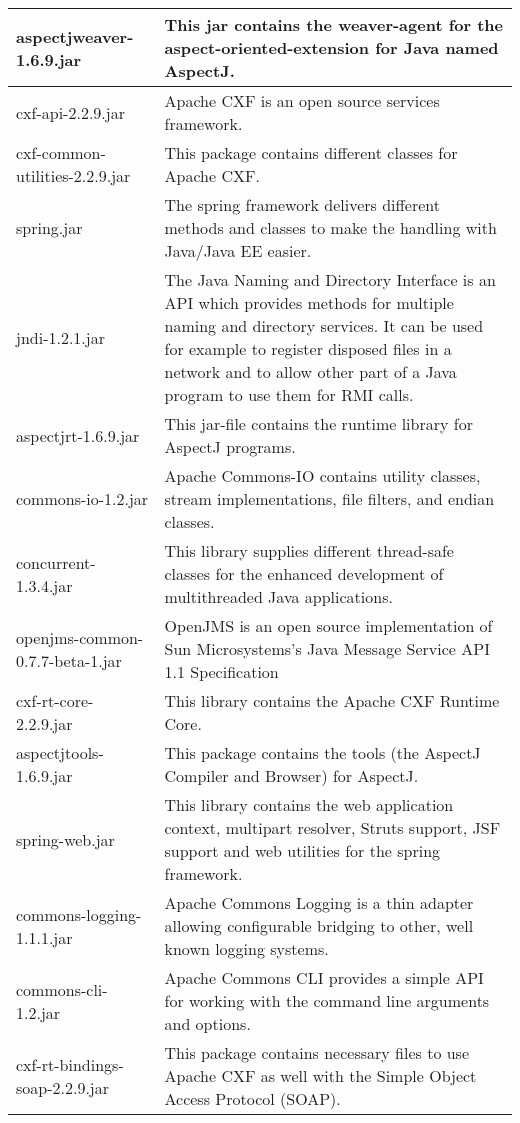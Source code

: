 \begin{center}
\begin{longtable}{|p{}|p{}|}
\hline 
aspectjweaver-1.6.9.jar & This jar contains the weaver-agent for the aspect-oriented-extension for Java named AspectJ.\\
\hline 
cxf-api-2.2.9.jar & Apache CXF is an open source services framework.  \\
\hline 
cxf-common-utilities-2.2.9.jar & This package contains different classes for Apache CXF.\\
\hline 
spring.jar & The spring framework delivers different methods and classes to make the handling with Java/Java EE easier.\\
\hline 
jndi-1.2.1.jar & The Java Naming and Directory Interface is an API which provides methods for multiple naming and directory services. It can be used for example to register disposed files in a network and to allow other part of a Java program to use them for RMI calls.\\
\hline 
aspectjrt-1.6.9.jar & This jar-file contains the runtime library for AspectJ programs.\\
\hline 
commons-io-1.2.jar & Apache Commons-IO contains utility classes, stream implementations, file filters, and endian classes.\\
\hline 
concurrent-1.3.4.jar & This library supplies different thread-safe classes for the enhanced development of multithreaded Java applications.\\
\hline 
openjms-common-0.7.7-beta-1.jar & OpenJMS is an open source implementation of Sun Microsystems's Java Message Service API 1.1 Specification\\
\hline 
cxf-rt-core-2.2.9.jar & This library contains the Apache CXF Runtime Core. \\
\hline 
aspectjtools-1.6.9.jar & This package contains the tools (the AspectJ Compiler and Browser) for AspectJ.\\
\hline 
spring-web.jar & This library contains the web application context, multipart resolver, Struts support, JSF support and web utilities for the spring framework.\\
\hline 
commons-logging-1.1.1.jar & Apache Commons Logging is a thin adapter allowing configurable bridging to other, well known logging systems.\\
\hline 
commons-cli-1.2.jar & Apache Commons CLI provides a simple API for working with the command line arguments and options.\\
\hline 
cxf-rt-bindings-soap-2.2.9.jar & This package contains necessary files to use Apache CXF as well with the Simple Object Access Protocol (SOAP).\\
\hline 
\end{longtable}
\label{tabular:libraries}
\end{center}
